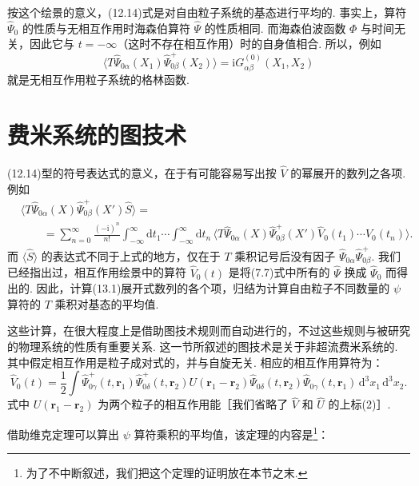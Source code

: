 按这个绘景的意义，(12.14)式是对自由粒子系统的基态进行平均的. 事实上，算符 $\hat\Psi_0$ 的性质与无相互作用时海森伯算符 $\hat\Psi$ 的性质相同. 而海森伯波函数 $\varPhi$ 与时间无关，因此它与 $t=-\infty$（这时不存在相互作用）时的自身值相合. 所以，例如
\begin{equation}
\langle T\hat\Psi_{0\alpha}(X_1)\hat\Psi^{+}_{0\beta}(X_2)\rangle=\mathrm{i}G^{(0)}_{\alpha\beta}(X_1,X_2)
\end{equation}
就是无相互作用粒子系统的格林函数.

\section{费米系统的图技术}

(12.14)型的符号表达式的意义，在于有可能容易写出按 $\hat V$ 的幂展开的数列之各项. 例如
\begin{equation}
\begin{aligned}
&\big\langle T\hat\Psi_{0\alpha}(X)\hat\Psi^{+}_{0\beta}(X')\hat S\big\rangle=\\
&\qquad=\sum_{n=0}^{\infty}\frac{(-\mathrm{i})^n}{n!}\int_{-\infty}^{\infty}\mathrm{d}t_1\cdots\int_{-\infty}^{\infty}\mathrm{d}t_n\,\big\langle T\hat\Psi_{0\alpha}(X)\hat\Psi^{+}_{0\beta}(X')\hat V_0(t_1)\cdots\hat V_0(t_n)\big\rangle.
\end{aligned}
\end{equation}
而 $\langle\hat S\rangle$ 的表达式不同于上式的地方，仅在于 $T$ 乘积记号后没有因子 $\hat\Psi_{0\alpha}\hat\Psi^{+}_{0\beta}$. 我们已经指出过，相互作用绘景中的算符 $\hat V_0(t)$ 是将(7.7)式中所有的 $\hat\Psi$ 换成 $\hat\Psi_0$ 而得出的. 因此，计算(13.1)展开式数列的各个项，归结为计算自由粒子不同数量的 $\psi$ 算符的 $T$ 乘积对基态的平均值.

这些计算，在很大程度上是借助图技术规则而自动进行的，不过这些规则与被研究的物理系统的性质有重要关系. 这一节所叙述的图技术是关于非超流费米系统的. 其中假定相互作用是粒子成对式的，并与自旋无关. 相应的相互作用算符为：
\begin{equation}
\hat V_0(t)=\frac{1}{2}\int\hat\Psi^{+}_{0\gamma}(t,\bm r_1)\hat\Psi^{+}_{0\delta}(t,\bm r_2)U(\bm r_1-\bm r_2)\hat\Psi_{0\delta}(t,\bm r_2)\hat\Psi_{0\gamma}(t,\bm r_1)\,\mathrm{d}^3x_1\,\mathrm{d}^3x_2.
\end{equation}
式中 $U(\bm r_1-\bm r_2)$ 为两个粒子的相互作用能［我们省略了 $\hat V$ 和 $\hat U$ 的上标(2)］.

借助维克定理可以算出 $\psi$ 算符乘积的平均值，该定理的内容是\footnote{为了不中断叙述，我们把这个定理的证明放在本节之末.}：

